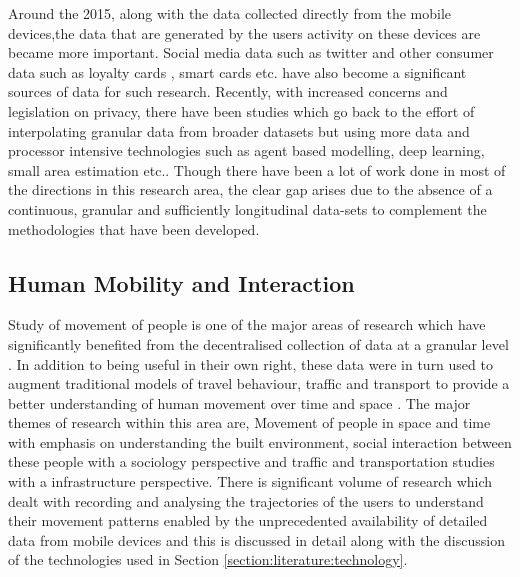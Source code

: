 Around the 2015, along with the data collected directly from the mobile devices,the data that are generated by the users activity on these devices are became more important.
Social media data such as twitter \citep{lansley2016a} and other consumer data such as loyalty cards \citep{lloyd2018}, smart cards \citep{ordonez2012} etc. have also become a significant sources of data for such research.
Recently, with increased concerns and legislation on privacy, there have been studies which go back to the effort of interpolating granular data from broader datasets but using more data and processor intensive technologies such as agent based modelling, deep learning, small area estimation \citep{crols2019, shibata2019, rao2015} etc..
Though there have been a lot of work done in most of the directions in this research area, the clear gap arises due to the absence of a continuous, granular and sufficiently longitudinal data-sets to complement the methodologies that have been developed. 

\subsection{Human Mobility and Interaction}

Study of movement of people is one of the major areas of research which have significantly benefited from the decentralised collection of data at a granular level \cite{castells2000}.
In addition to being useful in their own right, these data were in turn used to augment traditional models of travel behaviour, traffic and transport to provide a better understanding of human movement over time and space \citep{janssens2013}.
The major themes of research within this area are, Movement of people in space and time with emphasis on understanding the built environment, social interaction between these people with a sociology perspective and traffic and transportation studies with a infrastructure perspective.
There is significant volume of research which dealt with recording and analysing the trajectories of the users to understand their movement patterns enabled by the unprecedented availability of detailed data from mobile devices and this is discussed in detail along with the discussion of the technologies used in Section \ref{section:literature:technology}.


